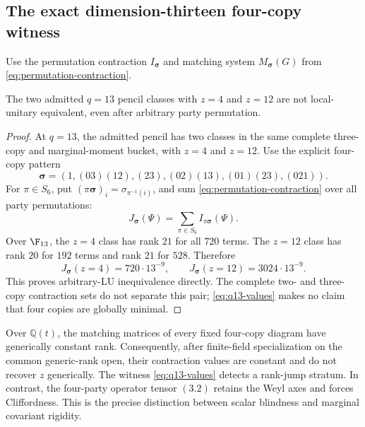 \subsection{The exact dimension-thirteen four-copy witness}

Use the permutation contraction
\(I_{\boldsymbol\sigma}\) and matching system
\(M_{\boldsymbol\sigma}(G)\) from
\eqref{eq:permutation-contraction}.

\begin{theorem}[Exact four-copy separator at \(q=13\)]
\label{thm:q13-lu}
The two admitted \(q=13\) pencil classes with \(z=4\) and \(z=12\) are
not local-unitary equivalent, even after arbitrary party permutation.
\end{theorem}

\begin{proof}
At \(q=13\), the admitted pencil has two classes in the same complete
three-copy and marginal-moment bucket, with \(z=4\) and \(z=12\).
Use the explicit four-copy pattern
\[
\boldsymbol\sigma=(1,(03)(12),(23),(02)(13),(01)(23),(021)).
\]
For \(\pi\in S_6\), put
\((\pi\boldsymbol\sigma)_i=\sigma_{\pi^{-1}(i)}\), and sum
\eqref{eq:permutation-contraction}
over all party permutations:
\[
 J_{\boldsymbol\sigma}(\Psi)
   =\sum_{\pi\in S_6}I_{\pi\boldsymbol\sigma}(\Psi).
\]
Over \(\F_{13}\), the \(z=4\) class has rank \(21\) for all \(720\)
terms.  The \(z=12\) class has rank \(20\) for \(192\) terms and rank
\(21\) for \(528\).
Therefore
\begin{equation}\label{eq:q13-values}
 J_{\boldsymbol\sigma}(z=4)=720\cdot13^{-9},\qquad
 J_{\boldsymbol\sigma}(z=12)=3024\cdot13^{-9}.
\end{equation}
This proves arbitrary-LU inequivalence directly.  The complete two- and
three-copy contraction sets do not separate this pair;
\eqref{eq:q13-values} makes no
claim that four copies are globally minimal.
\end{proof}

Over \(\mathbb Q(t)\), the matching matrices of every fixed four-copy
diagram have generically constant rank.  Consequently, after finite-field
specialization on the common generic-rank open, their contraction values
are constant and do not recover \(z\) generically.  The witness
\eqref{eq:q13-values} detects a rank-jump stratum.  In contrast, the four-party
operator tensor \((3.2)\) retains the Weyl axes and forces Cliffordness.
This is the precise distinction between scalar blindness and marginal
covariant rigidity.
